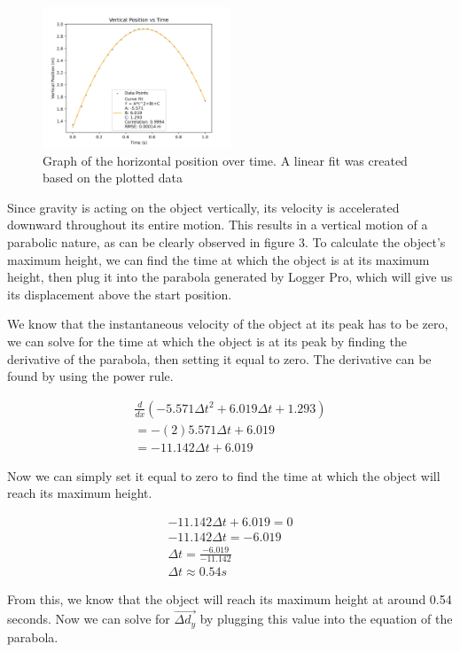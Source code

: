 \documentclass[10pt,twocolumn,letterpaper]{article}
\begin{document}
\begin{figure}
  \centering
  \includegraphics[width=0.5\textwidth]{figures/height_vs_time.png}
  \caption{Graph of the horizontal position over time. A linear fit was created based on the plotted data}
\end{figure}

Since gravity is acting on the object vertically, its velocity is accelerated downward throughout its entire motion. This results in a vertical motion of a parabolic nature, as can be clearly observed in figure 3. To calculate the object's maximum height, we can find the time at which the object is at its maximum height, then plug it into the parabola generated by Logger Pro, which will give us its displacement above the start position.

We know that the instantaneous velocity of the object at its peak has to be zero, we can solve for the time at which the object is at its peak by finding the derivative of the parabola, then setting it equal to zero. The derivative can be found by using the power rule. 

\begin{align}
    \nonumber\frac{d}{dx}(-5.571\Delta t^2+6.019\Delta t+1.293)\\
    \nonumber=-(2)5.571\Delta t+6.019\\
    \nonumber=-11.142\Delta t+6.019
\end{align}

Now we can simply set it equal to zero to find the time at which the object will reach its maximum height. 

\begin{align}
\nonumber-11.142\Delta t+6.019=0\\
\nonumber-11.142\Delta t=-6.019\\
\nonumber\Delta t=\frac{-6.019}{-11.142}\\
\nonumber\Delta t\approx 0.54s
\end{align}

From this, we know that the object will reach its maximum height at around 0.54 seconds. Now we can solve for \(\overrightarrow{\Delta d_{y}}\) by plugging this value into the equation of the parabola. 
\end{document}
